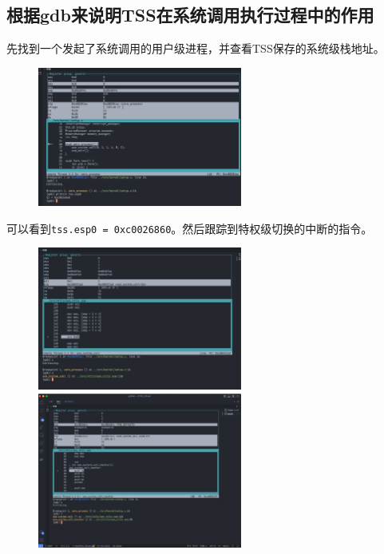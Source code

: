 \subsection{根据gdb来说明TSS在系统调用执行过程中的作用}

先找到一个发起了系统调用的用户级进程，并查看TSS保存的系统级栈地址。

\begin{figure}[H]
    \centering
    \includegraphics[width=0.6\textwidth]{figures/tss0.png}
    \label{tss0}
\end{figure}

可以看到\texttt{tss.esp0 = 0xc0026860}。然后跟踪到特权级切换的中断的指令。

\begin{figure}[H]
    \centering
    \includegraphics[width=0.6\textwidth]{figures/tss1.png}
    \vspace{1em}
    \includegraphics[width=0.6\textwidth]{figures/tss2.png}
    \label{tss1}
\end{figure}

